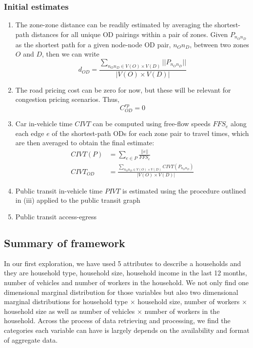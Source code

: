 \documentclass[11pt,twoside]{article}
\numberwithin{equation}{section}
\newcommand{\?}{\stackrel{?}{=}}
\newcommand{\fr}{\frac}
\begin{document}
\subsubsection{Initial estimates}
\begin{enumerate}
\item The zone-zone distance can be readily estimated by averaging the shortest-path distances for all unique OD pairings within a pair of zones. Given $P_{n_O n_D}$ as the shortest path for a given node-node OD pair, $n_On_D$, between two zones $O$ and $D$, then we can write
  \begin{equation}
    d_{OD} = \frac{\sum_{n_On_D \in V(O) \times V(D)}|| P_{n_On_D}||}{|V(O) \times V(D)|}
  \end{equation}
\item The road pricing cost can be zero for now, but these will be relevant for congestion pricing scenarios. Thus,
  \begin{equation}
    C^{rp}_{OD} = 0
  \end{equation}
\item Car in-vehicle time $CIVT$ can be computed using free-flow speeds $FFS_e$ along each edge $e$ of the shortest-path ODs for each zone pair to travel times, which are then averaged to obtain the final estimate:
  \begin{align}
    CIVT(P) &= \sum_{e \in P} \fr{||e||}{FFS_e}\\
    CIVT_{OD} &= \frac{\sum_{n_On_D \in V(O) \times V(D)} CIVT(P_{n_On_D})}{|V(O) \times V(D)|}
  \end{align}
\item Public transit in-vehicle time $PIVT$ is estimated using the procedure outlined in (iii) applied to the public transit graph
\item  Public transit access-egress 
\end{enumerate}


\subsection{Summary of framework}
In our first exploration, we have used 5 attributes to describe a households and they are household type, household size, household income in the last 12 months, number of vehicles and number of workers in the household. We not only find one dimensional marginal distribution for those variables but also two dimensional marginal distributions for household type $\times$ household size, number of workers $\times$ household size as well as number of vehicles $\times$ number of workers in the household. Across the process of data retrieving and processing, we find the categories each variable can have is largely depends on the availability and format of aggregate data.
\end{document}
